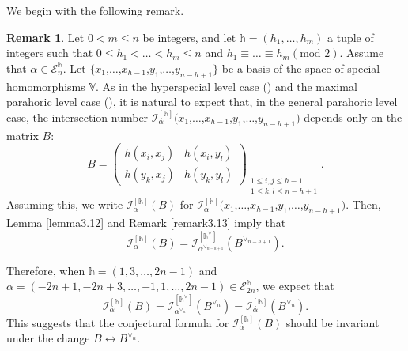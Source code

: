 \documentclass[11pt,oneside]{amsart}
\theoremstyle{plain}
\theoremstyle{definition}
\newtheorem{remark}[theorem]{Remark}
\theoremstyle{remark}
\newcommand{\tx}[1]{\text{#1}}
\newcommand{\BV}{{\mathbb V}}
\newcommand{\CE}{{\mathcal E}}
\newcommand{\CI}{{\mathcal I}}
\numberwithin{equation}{section}
\begin{document}
	We begin with the following remark.
	
	\begin{remark}\label{remark4.1} 	Let $0 < m \leq n$ be integers, and let $\mathds{h}=(h_1,\dots,h_m)$ a tuple of integers such that $0\leq h_1<\dots<h_m \leq n$ and $h_1 \equiv \dots \equiv h_m (\tx{mod } 2)$. Assume that $\alpha \in \CE_n^{\mathds{h}}$. Let $\lbrace x_1$,$\dots$,$x_{h-1}$,$y_1$,$\dots$,$y_{n-h+1} \rbrace$ be a basis of the space of special homomorphisms $\BV$. As in the hyperspecial level case (\cite{KR1}) and the maximal parahoric level case (\cite{Cho}), it is natural to expect that, in the general parahoric level case, the intersection number $\CI_{\alpha}^{[\mathds{h}]}(x_1$,$\dots$,$x_{h-1}$,$y_1$,$\dots$,$y_{n-h+1})$ depends only on the matrix $B$:
		\begin{equation*}
			B=	\left(\begin{array}{cc} 
				h(x_i,x_j) & h(x_i,y_l)\\
				h(y_k,x_j)& h(y_k,y_l)
			\end{array} 
			\right)_{\substack{1\leq i,j \leq h-1\\ 1 \leq k,l \leq n-h+1}}.
		\end{equation*}
		Assuming this, we write $\CI_{\alpha}^{[\mathds{h}]}(B)$ for $\CI_{\alpha}^{[\mathds{h}]}(x_1$,$\dots$,$x_{h-1}$,$y_1$,$\dots$,$y_{n-h+1})$. Then, Lemma \ref{lemma3.12} and Remark \ref{remark3.13} imply that
		\begin{equation*}
			\CI_{\alpha}^{[\mathds{h}]}(B)=\CI_{\alpha^{\vee_{n-h+1}}}^{[\mathds{h}^{\vee}]}(B^{\vee_{n-h+1}}).
		\end{equation*}
		
		Therefore, when $\mathds{h}=(1,3,\dots,2n-1)$ and $\alpha=(-2n+1,-2n+3,\dots,-1,1,\dots,2n-1) \in \CE_{2n}^{\mathds{h}}$, we expect that
		\begin{equation*}
			\CI_{\alpha}^{[\mathds{h}]}(B)=\CI_{\alpha^{\vee_n}}^{[\mathds{h}^{\vee}]}(B^{\vee_n})=\CI_{\alpha}^{[\mathds{h}]}(B^{\vee_n}).
		\end{equation*}
		This suggests that the conjectural formula for $\CI_{\alpha}^{[\mathds{h}]}(B)$ should be invariant under the change $B \leftrightarrow B^{\vee_n}$.
	\end{remark}
	
\end{document}
